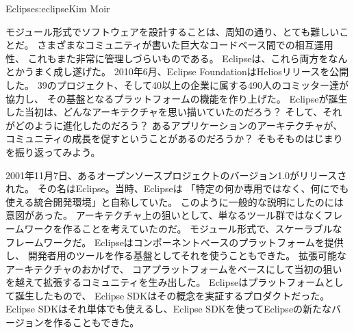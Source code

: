 \begin{aosachapter}{Eclipse}{s:eclipse}{Kim Moir}

モジュール形式でソフトウェアを設計することは、周知の通り、とても難しいことだ。
さまざまなコミュニティが書いた巨大なコードベース間での相互運用性、
これもまた非常に管理しづらいものである。
Eclipseは、これら両方をなんとかうまく成し遂げた。
2010年6月、Eclipse FoundationはHeliosリリースを公開した。
39のプロジェクト、そして40以上の企業に属する490人のコミッター達が協力し、
その基盤となるプラットフォームの機能を作り上げた。
Eclipseが誕生した当初は、どんなアーキテクチャを思い描いていたのだろう？
そして、それがどのように進化したのだろう？
あるアプリケーションのアーキテクチャが、コミュニティの成長を促すということがあるのだろうか？
そもそものはじまりを振り返ってみよう。

2001年11月7日、あるオープンソースプロジェクトのバージョン1.0がリリースされた。
その名はEclipse。当時、Eclipseは
「特定の何か専用ではなく、何にでも使える統合開発環境」と自称していた。
このように一般的な説明にしたのには意図があった。
アーキテクチャ上の狙いとして、単なるツール群ではなくフレームワークを作ることを考えていたのだ。
モジュール形式で、スケーラブルなフレームワークだ。
Eclipseはコンポーネントベースのプラットフォームを提供し、
開発者用のツールを作る基盤としてそれを使うこともできた。
拡張可能なアーキテクチャのおかげで、
コアプラットフォームをベースにして当初の狙いを越えて拡張するコミュニティを生み出した。
Eclipseはプラットフォームとして誕生したもので、
Eclipse SDKはその概念を実証するプロダクトだった。
Eclipse SDKはそれ単体でも使えるし、Eclipse SDKを使ってEclipseの新たなバージョンを作ることもできた。


\end{aosachapter}
